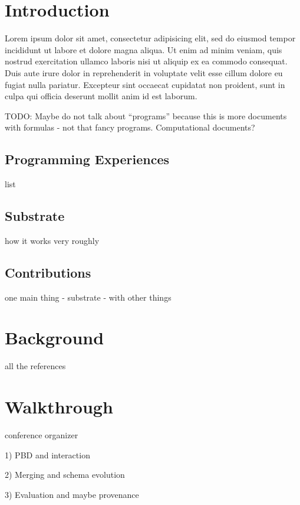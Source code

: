 \documentclass[sigconf]{acmart}
\begin{document}
\newpage

\section{Introduction}

Lorem ipsum dolor sit amet, consectetur adipisicing elit, sed do eiusmod tempor incididunt ut labore et dolore magna aliqua. Ut enim ad minim veniam, quis nostrud exercitation ullamco laboris nisi ut aliquip ex ea commodo consequat. Duis aute irure dolor in reprehenderit in voluptate velit esse cillum dolore eu fugiat nulla pariatur. Excepteur sint occaecat cupidatat non proident, sunt in culpa qui officia deserunt mollit anim id est laborum.

TODO: Maybe do not talk about ``programs'' because this is more documents with formulas - not that fancy programs.
Computational documents?

\subsection{Programming Experiences}
list

\subsection{Substrate}
how it works very roughly

\subsection{Contributions}
one main thing - substrate - with other things


\section{Background}
all the references

\section{Walkthrough}
conference organizer

1) PBD and interaction

2) Merging and schema evolution

3) Evaluation and maybe provenance

\newpage

\end{document}
